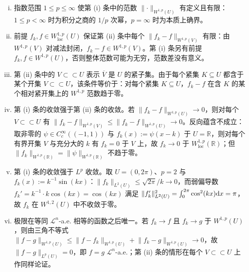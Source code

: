 \documentclass[../../main.tex]{subfiles}%
\begin{document}
\begin{remark}\label{remark:ch04-def-4-3-条件}
\begin{enumerate}[(i)]
\item 指数范围 $1\leqslant p\leqslant\infty$ 使第 (i) 条中的范数 $\lVert\cdot\rVert_{W^{1,p}(U)}$ 有定义且有限：$1\leqslant p<\infty$ 时为积分之商的 $1/p$ 次幂，$p=\infty$ 时为本质上确界。
\item 前提 $f_k,f\in W^{1,p}_{\mathrm{loc}}(U)$ 保证第 (ii) 条中每个 $\lVert f_k-f\rVert_{W^{1,p}(V)}$ 有限：由 $W^{1,p}(V)$ 对减法封闭，$f_k-f\in W^{1,p}(V)$。第 (i) 条另有前提 $f_k,f\in W^{1,p}(U)$，否则整体范数可能为无穷，范数差没有意义。
\item 第 (ii) 条中的 $V\subset\subset U$ 表示 $\overline{V}$ 是 $U$ 的紧子集。由于每个紧集 $K\subseteq U$ 都含于某个开集 $V\subset\subset U$，该条件等价于：对每个紧集 $K\subseteq U$，$f_k-f$ 在含 $K$ 的某个相对紧开集上的 $W^{1,p}$ 范数趋于零。
\item 第 (i) 条的收敛强于第 (ii) 条的收敛。若 $\lVert f_k-f\rVert_{W^{1,p}(U)}\to0$，则对每个 $V\subset\subset U$ 有 $\lVert f_k-f\rVert_{W^{1,p}(V)}\leqslant\lVert f_k-f\rVert_{W^{1,p}(U)}\to0$。反向蕴含不成立：取非零的 $\psi\in C_c^{\infty}((-1,1))$ 与 $f_k(x):=\psi(x-k)$ 于 $U=\mathbb{R}$，则对每个有界开集 $V$ 与充分大的 $k$ 有 $f_k=0$ 于 $V$ 上，故 $f_k\to0$ 于 $W^{1,p}_{\mathrm{loc}}(\mathbb{R})$；但 $\lVert f_k\rVert_{W^{1,p}(\mathbb{R})}=\lVert\psi\rVert_{W^{1,p}(\mathbb{R})}$ 不趋于零。
\item 第 (i) 条的收敛强于 $L^{p}$ 收敛。取 $U=(0,2\pi)$、$p=2$ 与 $f_k(x):=k^{-1}\sin(kx)$：$\lVert f_k\rVert_{L^{2}(U)}\leqslant\sqrt{2\pi}/k\to0$，而弱偏导数 $f_k'=k^{-1}\cdot k\cos(kx)=\cos(kx)$ 满足 $\lVert f_k'\rVert_{L^{2}(U)}^{2}=\int_{0}^{2\pi}\cos^{2}(kx)\mathrm{d} x=\pi$，故 $f_k$ 在 $W^{1,2}(U)$ 中不收敛于零。
\item 极限在等同 $\mathcal{L}^{n}$-a.e. 相等的函数之后唯一。若 $f_k\to f$ 且 $f_k\to g$ 于 $W^{1,p}(U)$，则由三角不等式 $\lVert f-g\rVert_{W^{1,p}(U)}\leqslant\lVert f-f_k\rVert_{W^{1,p}(U)}+\lVert f_k-g\rVert_{W^{1,p}(U)}\to0$，故 $\lVert f-g\rVert_{L^{p}(U)}=0$，即 $f=g$ $\mathcal{L}^{n}$-a.e.；第 (ii) 条的情形在每个 $V\subset\subset U$ 上作同样论证。
\end{enumerate}
\end{remark}
\end{document}
